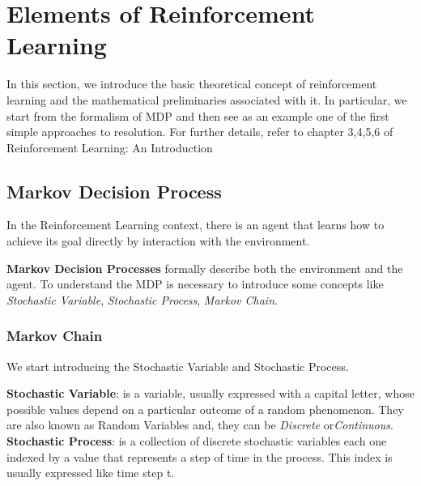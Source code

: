 
\newcommand\tab[1][1cm]{\hspace*{#1}}
\newcommand\Doubletab[1][2cm]{\hspace*{#1}}

\chapter{Elements of Reinforcement Learning} 
\label{Chapter3} %



In this section, we introduce the basic theoretical concept of reinforcement learning and the mathematical preliminaries associated with it.
In particular, we start from the formalism of MDP and then see as an example one of the first simple approaches to resolution.
For further details, refer to chapter 3,4,5,6 of Reinforcement Learning: An Introduction
\cite{bib:2018Sutton_RLBook}


\section{Markov Decision Process}
In the Reinforcement Learning context, there is an agent that learns how to achieve its goal directly by interaction with the environment. 

\textbf{Markov Decision Processes} formally describe both the environment and the agent. To understand the MDP is necessary to introduce some concepts like \textit{Stochastic Variable}, \textit{Stochastic Process}, \textit{Markov Chain}.

\subsection{Markov Chain}
We start introducing the Stochastic Variable and Stochastic Process.

\textbf{Stochastic Variable}: is a variable, usually expressed with a capital letter, whose possible values depend on a particular outcome of a random phenomenon. 
They are also known as Random Variables and, they can be \textit{Discrete} or\textit{Continuous}.
\\

\textbf{Stochastic Process}: is a collection of discrete stochastic variables each one indexed by a value that represents a step of time in the process.
This index is usually expressed like time step t.
\\

